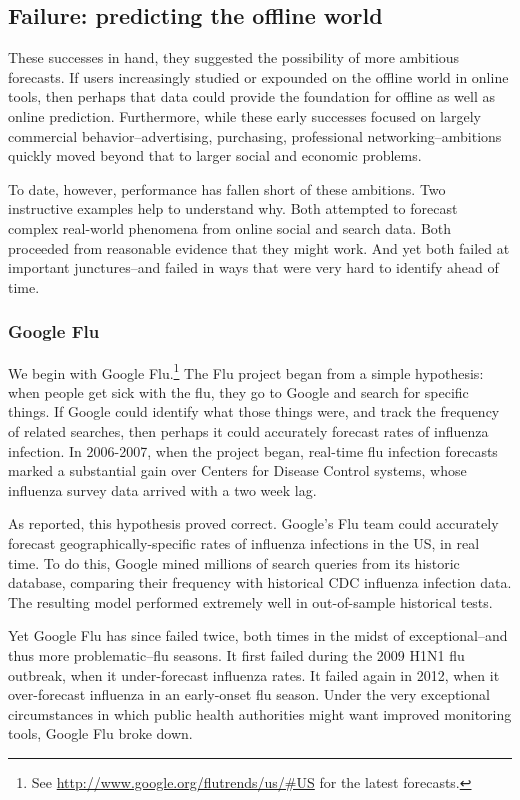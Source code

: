 \documentclass{article}
\begin{document}
\subsection{Failure: predicting the offline world}
\label{sec:fail-pred-offl}


These successes in hand, they suggested the possibility of more
ambitious forecasts. If users increasingly studied or expounded on the
offline world in online tools, then perhaps that data could provide
the foundation for offline as well as online prediction. Furthermore,
while these early successes focused on largely commercial
behavior--advertising, purchasing, professional networking--ambitions
quickly moved beyond that to larger social and economic problems.

To date, however, performance has fallen short of these ambitions. Two
instructive examples help to understand why. Both attempted to
forecast complex real-world phenomena from online social and search
data. Both proceeded from reasonable evidence that they might
work. And yet both failed at important junctures--and failed in ways
that were very hard to identify ahead of time. 

\subsubsection{Google Flu}
\label{sec:google-flu}


We begin with Google Flu.\footnote{See
  \url{http://www.google.org/flutrends/us/\#US} for the latest
  forecasts.} The Flu project began from a simple hypothesis: when
people get sick with the flu, they go to Google and search for
specific things. If Google could identify what those things were, and
track the frequency of related searches, then perhaps it could
accurately forecast rates of influenza infection. In 2006-2007, when
the project began, real-time flu infection
forecasts marked a substantial gain over Centers for Disease Control
systems, whose influenza survey data arrived with a two week lag. 

As \cite{ginsberg2008detecting} reported, this hypothesis proved
correct. Google's Flu team could accurately forecast
geographically-specific rates of influenza infections in the US, in
real time. To do this, Google mined millions of search queries from
its historic database, comparing their frequency with historical CDC
influenza infection data. The resulting model performed extremely well
in out-of-sample historical tests. 

Yet Google Flu has since failed twice, both times in the midst of
exceptional--and thus more problematic--flu seasons. It first failed
during the 2009 H1N1 flu outbreak, when it under-forecast influenza
rates. It failed again in 2012, when it over-forecast influenza in an
early-onset flu season. Under the very exceptional circumstances in
which public health authorities might want improved monitoring tools,
Google Flu broke down. 
\end{document}
